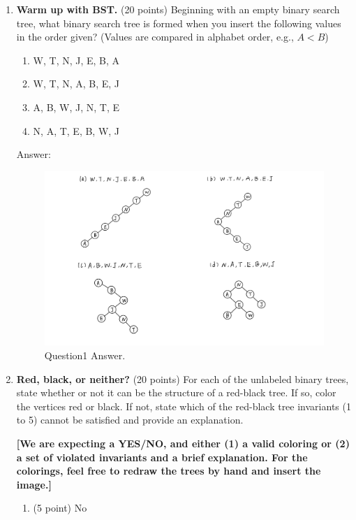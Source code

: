 \documentclass[12pt]{article}
\begin{document}
\begin{enumerate}
	\item \textbf{Warm up with BST.} (20 points) Beginning with an empty binary search tree, what binary search tree is formed when you insert the following values in the order given? (Values are compared in alphabet order, e.g., $A<B$)
		\begin{enumerate}
			\item W, T, N, J, E, B, A
			\item W, T, N, A, B, E, J
			\item A, B, W, J, N, T, E
			\item N, A, T, E, B, W, J
		\end{enumerate}

    {\color{blue}Answer:
   \begin{figure}[h]
  	\centering
  	\includegraphics*[scale=0.2]{Question1-1.jpg}
	\caption{Question1 Answer.}
	\label{fig:example}
  \end{figure}}
 
  
  

  \item \textbf{Red, black, or neither?} (20 points) For each of the unlabeled binary trees, state whether or not it can be the structure of a red-black tree. If so, color the vertices red or black. If not, state which of the red-black tree invariants (1 to 5) cannot be satisfied and provide an explanation.

    \textbf{[We are expecting a YES/NO, and either (1) a valid coloring or (2) a set of violated invariants and a brief explanation. For the colorings, feel free to redraw the trees by hand and insert the image.]}
    
    \begin{multicols}{2}
      \begin{enumerate}
        \item (5 point) No


\end{enumerate}
\end{multicols}
\end{enumerate}
\end{document}
